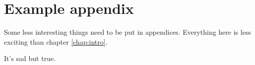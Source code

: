 \chapter{Example appendix}
\label{app:example}

Some less interesting things need to be put in appendices. Everything here is less exciting than chapter \ref{chap:intro}.

\newpage
It's sad but true.